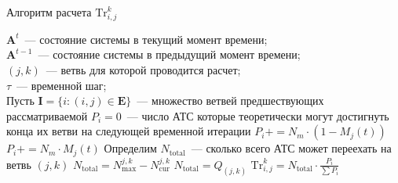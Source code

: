 \begin{algorithm}[!hb]
    \caption{Алгоритм расчета \(\text{Tr}_{i, j}^k\)}
    \label{max_transfer_calculation}
    \begin{algorithmic}
        \REQUIRE \(\mathbf{A}^t\)~--- состояние системы в текущий момент времени; \\
                 \(\mathbf{A}^{t-1}\)~--- состояние системы в предыдущий момент времени; \\
                 \((j,k)\)~--- ветвь для которой проводится расчет; \\
                 \(\tau\)~--- временной шаг; \\
        \STATE Пусть \(\mathbf{I} = \{i : (i,j) \in \mathbf{E}\}\)~--- множество ветвей предшествующих рассматриваемой
            \STATE \(P_i = 0\)~--- число АТС которые теоретически могут достигнуть конца их ветви на следующей временной итерации
                        \STATE \(P_i += N_m \cdot (1 - M_j(t))\)
                    \ELSE
                        \STATE \(P_i += N_m \cdot M_j(t)\)
                    \ENDIF
                \ENDIF
            \ENDFOR
        \ENDFOR
        \STATE Определим \(N_\text{total}\)~--- сколько всего АТС может переехать на ветвь \((j,k)\)
            \STATE \(N_\text{total} = N^{j,k}_\text{max} - N^{j,k}_\text{cur}\)
        \ELSE
            \STATE \(N_\text{total} = Q_(j,k)\)
        \ENDIF
            \STATE \(\text{Tr}_{i, j}^k = N_\text{total} \cdot \frac{P_i}{\sum P_i}\)
        \ENDFOR
    \end{algorithmic}
\end{algorithm}

